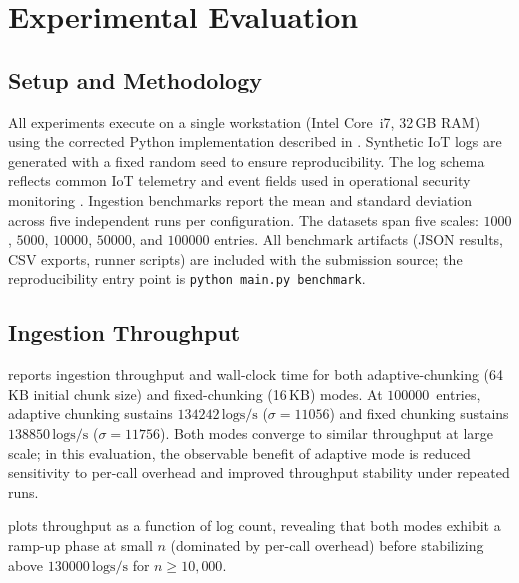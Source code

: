 \documentclass[preprint,12pt]{elsarticle}
\begin{document}
\section{Experimental Evaluation}
\label{sec:evaluation}

\subsection{Setup and Methodology}

All experiments execute on a single workstation (Intel Core~i7, 32\,GB RAM) using the corrected Python implementation described in .
Synthetic IoT logs are generated with a fixed random seed to ensure reproducibility.
The log schema reflects common IoT telemetry and event fields used in operational security monitoring \citep{hassan2019survey,nist2020iot,nist80092,rfc5424}.
Ingestion benchmarks report the mean and standard deviation across five independent runs per configuration.
The datasets span five scales: $1000$, $5000$, $10000$, $50000$, and $100000$ entries.
All benchmark artifacts (JSON results, CSV exports, runner scripts) are included with the submission source; the reproducibility entry point is \texttt{python main.py benchmark}.

\subsection{Ingestion Throughput}
\label{sec:ingestion}

 reports ingestion throughput and wall-clock time for both adaptive-chunking (64\,KB initial chunk size) and fixed-chunking (16\,KB) modes.
At $100000$~entries, adaptive chunking sustains $134242\,\mathrm{logs/s}$ ($\sigma = 11056$) and fixed chunking sustains $138850\,\mathrm{logs/s}$ ($\sigma = 11756$).
Both modes converge to similar throughput at large scale; in this evaluation, the observable benefit of adaptive mode is reduced sensitivity to per-call overhead and improved throughput stability under repeated runs.

 plots throughput as a function of log count, revealing that both modes exhibit a ramp-up phase at small $n$ (dominated by per-call overhead) before stabilizing above $130000\,\mathrm{logs/s}$ for $n \ge 10{,}000$.
\end{document}
